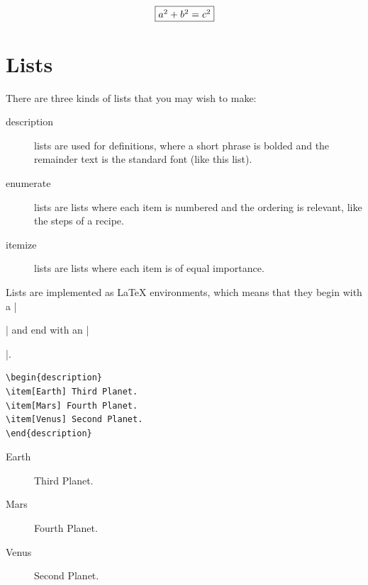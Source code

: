 \begin{equation}
\fbox{$a^2 + b^2 = c^2$}
\end{equation}



\section{Lists}

There are three kinds of lists that you may wish to make:

\begin{description}
\item[description] lists are used for definitions, where a  short phrase is bolded and the remainder text is the standard font (like this list).
 \item[enumerate] lists are lists where each item is numbered and the
  ordering is relevant, like the steps of a recipe. 
\item[itemize] lists are lists where each item is of equal
  importance.
\end{description}

Lists are implemented as \LaTeX{} environments, which means that they
begin with a |\begin{|\emph{listname}|}| and end with an
|\end{|\emph{listname}|}|.

\begin{minipage}{.45\textwidth}
\begin{Verbatim}
\begin{description}
\item[Earth] Third Planet.
\item[Mars] Fourth Planet.
\item[Venus] Second Planet.
\end{description}
\end{Verbatim}
\end{minipage}
\hfill
\begin{minipage}{.45\textwidth}
\begin{description}
\item[Earth] Third Planet.
\item[Mars] Fourth Planet.
\item[Venus] Second Planet.
\end{description}
\end{minipage}


